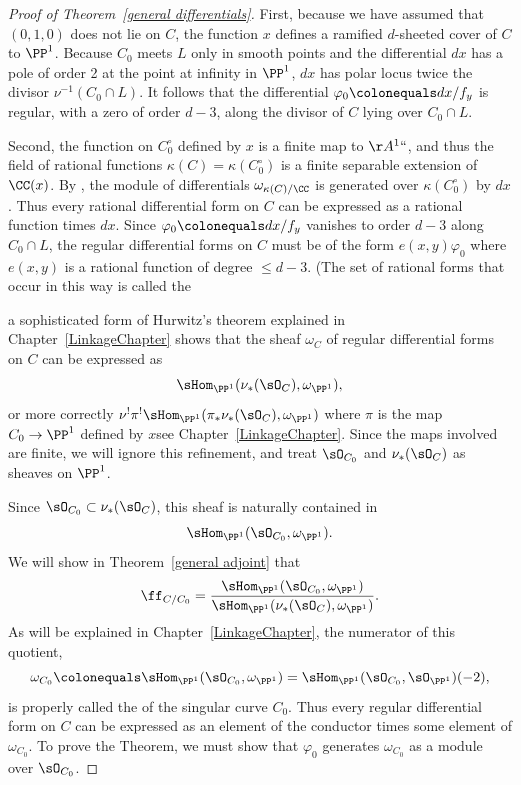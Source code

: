 \begin{proof}[Proof of Theorem~\ref{general differentials}]
%
First, because we have assumed that $(0,1,0)$ does not lie on $C$,
the function $x$ defines a
ramified $d$-sheeted cover of $C$ to $\PP^{1}$. Because $C_{0}$ meets $L$
only in smooth
points and the differential $dx$ has a pole of order 2 at the point at
infinity in $\PP^{1}$,
$dx$
has polar locus twice the divisor $ \nu^{-1}(C_{0}\cap L)$. It follows
that
the differential
$\varphi_0 \colonequals  dx/f_{y}$ is regular, with a zero of order $d-3$,
along the divisor of $C$ lying over $C_0\cap L$.

Second, the function on $C^\circ_0$ defined by $x$
is a finite map to $\AA^1` `$, and thus the field of rational functions
$\kappa(C) = \kappa(C^\circ_0)$ is a finite
separable extension of $\CC(x)$. By \cite[Section 16.5]{Eisenbud1995},
the module of differentials
$\omega_{\kappa(C)/\CC}$ is generated over $\kappa(C^\circ_0)$ by
$dx$. Thus every rational
differential form on $C$ can be expressed as a rational function
times $dx$. Since $\varphi_{0} \colonequals  dx/f_{y}$ vanishes to order
$d-3$ along $C_{0}\cap L$,
the regular differential forms on $C$ must be of the form
$e(x,y)\varphi_{0}$ where
$e(x,y)$ is a rational function of degree $\leq d-3$. (The set of rational
forms that occur in this
%
way is called the 

a sophisticated form of Hurwitz's theorem 
explained in
Chapter~\ref{LinkageChapter}
shows that the sheaf $\omega_{C}$ of regular differential forms on $C$
can be expressed as
$$
\sHom_{\PP^{1}}(\nu_{*}(\sO_{C}), \omega_{\PP^{1}}),
$$
or more correctly $\nu^{!}\pi^{!}\sHom_{\PP^{1}}(\pi_{*}\nu_{*}(\sO_{C}),
\omega_{\PP^{1}})$
where $\pi$ is the map $C_{0}\to \PP^{1}$ defined by $x$\emdash see
Chapter~\ref{LinkageChapter}. Since the maps involved are finite,
we will ignore this refinement, and treat $\sO_{C_{0}}$ and
$\nu_{*}(\sO_{C})$ as sheaves on $\PP^{1}$.

Since $\sO_{C_{0}}\subset \nu_{*}(\sO_{C})$, this sheaf is naturally
contained
in
$$
\sHom_{\PP^{1}}(\sO_{C_{0}}, \omega_{\PP^{1}}).
$$
We will show in Theorem~\ref{general adjoint} that
\vspace*{3pt}
$$
\vspace*{3pt}
\ff_{C/C_{0}} =
\frac{\sHom_{\PP^{1}}(\sO_{C_{0}}, \omega_{\PP^{1}})}
{\sHom_{\PP^{1}}(\nu_{*}(\sO_{C}), \omega_{\PP^{1}})}.
$$
As will be explained in Chapter~\ref{LinkageChapter}, the numerator of
this quotient,
$$
\omega_{C_{0}}\colonequals  \sHom_{\PP^{1}}(\sO_{C_{0}}, \omega_{\PP^{1}})
=
\sHom_{\PP^{1}}(\sO_{C_{0}}, \sO_{\PP^{1}})(-2),
$$
 is properly called the 
%
of the singular curve $C_{0}$.
Thus every regular differential form on $C$ can be expressed as an
element of the conductor
times some element of $\omega_{C_{0}}$. To prove the Theorem, we must
show that
$\varphi_{0}$ generates $\omega_{C_{0}}$ as a module over $\sO_{C_{0}}$.


\end{proof}
